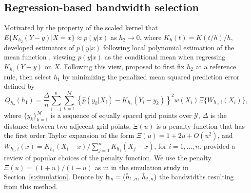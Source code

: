 \documentclass[fleqn,12pt,twoside]{article}
\newcommand{\calM}{\mathcal{M}}
\newcommand{\bh}{\mathbf{h}}
\numberwithin{equation}{section}
\begin{document}
\subsection{Regression-based bandwidth selection}
Motivated by the property of the scaled kernel that $E\{ K_{h_2}(Y-y)|X=x \}\approx p(y|x)$ as $h_2\to 0$, where $K_h(t)=K(t/h)/h$, \cite{Fan.etal1996} developed estimators of $p(y|x)$ following local polynomial estimation of the mean function \citep{Fan&Gijbels1996}, viewing $p(y|x)$ as the conditional mean when regressing $K_{h_2}(Y-y)$ on $X$. Following this view, \cite{Bashtannyk.Hyndman2001} proposed to first fix $h_2$ at a reference rule, then select $h_1$ by minimizing the penalized mean squared prediction error defined by
\begin{equation}\label{regression}
Q_{h_2}(h_1) = \frac{\Delta}{n} \sum_{i=1}^{n} \sum_{k=1}^{\calM} \left\{ \hat{p}(y_k|X_i)-K_{h_2}(Y_i-y_k) \right\}^2w(X_i) \Xi\{W_{h_1,i}(X_i)\},
\end{equation}
where $\{y_k\}_{k=1}^{\calM}$ is a sequence of equally spaced grid points over $\mathscr{Y}$, $\Delta$ is the distance between two adjecent grid points, $\Xi(u)$ is a penalty function that has the first order Taylor expansion of the form $\Xi(u)=1+2u+O(u^2)$, and $W_{h_1,i}(x) = K_{h_1}\left(X_i-x\right)/\sum_{j=1}^n K_{h_1}\left(X_j-x\right)$, for $i=1, \ldots, n$. \cite{Koehler.etal2014} provided a review of popular choices of the penalty function. We use the penalty $\Xi(u)=(1+u)/(1-u)$ as in \cite{Akaike1970} in the simulation study in Section~\ref{s:simulation}. Denote by $\bh_{\hbox {\tiny $R$}}=(\hat{h}_{1,\hbox {\tiny $R$}}, \, \hat{h}_{2,\hbox{\tiny $R$}})$ the bandwidths resulting from this method. 
\end{document}
